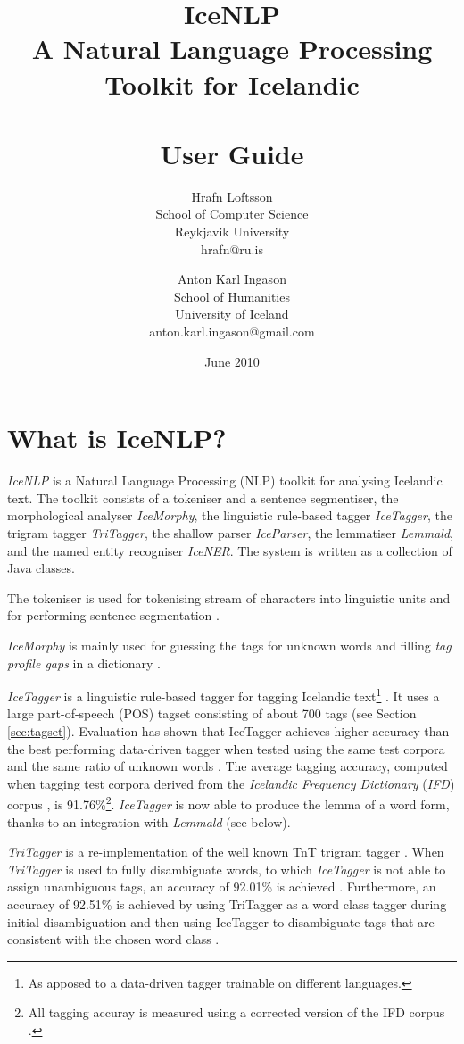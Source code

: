 \documentclass[11pt]{article}
\title{IceNLP \\
A Natural Language Processing Toolkit for Icelandic \\ \ \\
    User Guide}
\author{Hrafn Loftsson \\
        School of Computer Science \\
        Reykjavik University \\
        hrafn@ru.is 
\and
	Anton Karl Ingason \\
	School of Humanities \\
	University of Iceland \\
	anton.karl.ingason@gmail.com \\
}
\begin{document}
\label{firstpage}
\date{June 2010}
\maketitle
\tableofcontents
\newpage

\section{What is IceNLP?}
\emph{IceNLP} is a Natural Language Processing (NLP) toolkit for analysing Icelandic text.
The toolkit consists of a tokeniser and a sentence segmentiser, the morphological analyser \emph{IceMorphy}, the linguistic rule-based tagger \emph{IceTagger}, the trigram tagger \emph{TriTagger}, the shallow parser \emph{IceParser}, the lemmatiser \emph{Lemmald}, and the named entity recogniser \emph{IceNER}.
The system is written as a collection of Java classes.

The tokeniser is used for tokenising stream of characters into linguistic units and for performing sentence segmentation \citep{pal00}.

\emph{IceMorphy} is mainly used for guessing the tags for unknown words and filling \emph{tag profile gaps} in a dictionary \citep{lof08}.

\emph{IceTagger} is a linguistic rule-based tagger for tagging Icelandic text\footnote{As apposed to a data-driven tagger trainable on different languages.} \citep{lof06,lof08}.
It uses a large part-of-speech (POS) tagset consisting of about 700 tags (see Section \ref{sec:tagset}).
Evaluation has shown that IceTagger achieves higher accuracy than the best performing data-driven tagger when tested using the same test corpora and the same ratio of unknown words \citep{lof08,hel04}.
The average tagging accuracy, computed when tagging test corpora derived from the \emph{Icelandic Frequency Dictionary} (\emph{IFD}) corpus \citep{pin91}, is 91.76\%\footnote{All tagging accuray is measured using a corrected version of the IFD corpus \citep{lof09}.}.
\emph{IceTagger} is now able to produce the lemma of a word form, thanks to an integration with \emph{Lemmald} (see below).

\emph{TriTagger} is a re-implementation of the well known TnT trigram tagger \citep{bra00}.
When \emph{TriTagger} is used to fully disambiguate words, to which \emph{IceTagger} is not able to assign unambiguous tags, an accuracy of 92.01\% is achieved \citep{lof06b,lof09b}.
Furthermore, an accuracy of 92.51\% is achieved by using TriTagger as a word class tagger during initial disambiguation and then using IceTagger to disambiguate tags that are consistent with the chosen word class \citep{lof09b}.
\end{document}
